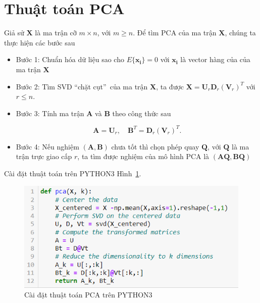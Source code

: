 \documentclass[12pt,a4paper,oneside]{report}
\numberwithin{equation}{section}
\begin{document}
\section{Thuật toán PCA}
Giả sử $\mathbf{X}$ là ma trận cỡ $m \times n$, với $m \geq n$. Để tìm $\mathrm{PCA}$ của ma trận $\mathbf{X}$, chúng ta thực hiện các bước sau
\begin{itemize}
\item Bước 1: Chuẩn hóa dữ liệu sao cho $E\{\mathbf{x_i}\}=0$ với $\mathbf{x_i}$ là vector hàng của của ma trận $\mathbf{X}$
\item Bước 2: Tìm SVD \textquotedblleft chặt cụt\textquotedblright\ của ma trận $\mathbf{X}$, ta được $\mathbf{X}=\mathbf{U}_{r} \mathbf{D}_{r}\left(\mathbf{V}_{r}\right)^{T}$ với $r \leq n$.
\item Bước 3: Tính ma trận $\mathbf{A}$ và $\mathbf{B}$ theo công thức sau

$$
\mathbf{A} =  \mathbf{U}_{r}, \quad \mathbf{B}^{T}= \mathbf{D}_{r}\left(\mathbf{V}_{r}\right)^{T}.
$$

\item Bước 4: Nếu nghiệm $(\mathbf{A, B})$ chưa tốt thì chọn phép quay $\mathbf{Q}$, với $\mathbf{Q}$ là ma trận trực giao cấp $r$, ta tìm được nghiệm của mô hình $\mathrm{PCA}$ là $(\mathbf{A Q, B Q})$
\end{itemize}
Cài đặt thuật toán trên PYTHON3
 Hình~\ref{fig:pca_algo}.
\begin{figure}[htp]
	\centering
	\includegraphics[scale=0.8]{implement_pca.png}
\caption{ Cài đặt thuật toán PCA trên PYTHON3}
\label{fig:pca_algo}
\end{figure}
\end{document}

